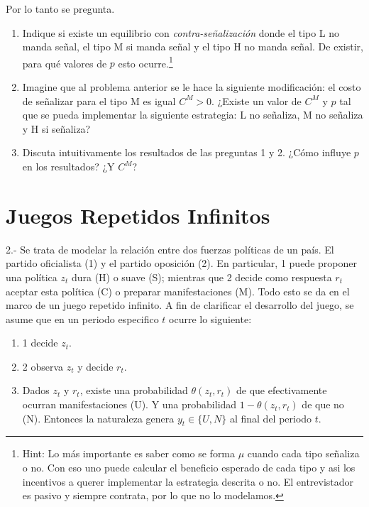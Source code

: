 \documentclass[11pt]{article}
\begin{document}
Por lo tanto se pregunta.
\begin{enumerate}
	\item Indique si existe un equilibrio con \textit{contra-se\~nalizaci\'on} donde el tipo L no manda se\~nal, el tipo M si manda se\~nal y el tipo H no manda se\~nal. De existir, para qu\'e valores de $p$ esto ocurre.\footnote{Hint: Lo m\'as importante es saber como se forma $\mu$ cuando cada tipo se\~naliza o no. Con eso uno puede calcular el beneficio esperado de cada tipo y asi los incentivos a querer implementar la estrategia descrita o no. El entrevistador es pasivo y siempre contrata, por lo que no lo modelamos.}
	\item Imagine que al problema anterior se le hace la siguiente modificaci\'on: el costo de se\~nalizar para el tipo M es igual $C^{M}>0$. ¿Existe un valor de $C^{M}$ y $p$ tal que se pueda implementar la siguiente estrategia: L no se\~naliza, M no se\~naliza y H si se\~naliza?
	\item Discuta intuitivamente los resultados de las preguntas 1 y 2. ¿C\'omo influye $p$ en los resultados? ¿Y $C^{M}$?
\end{enumerate}


\section*{Juegos Repetidos Infinitos}

2.- Se trata de modelar la relaci\'on entre dos fuerzas pol\'iticas de un pa\'is. El partido oficialista (1) y el partido oposici\'on (2). En particular, 1 puede proponer una pol\'itica $z_{t}$ dura (H) o suave (S); mientras que 2 decide como respuesta $r_{t}$ aceptar esta pol\'itica (C) o preparar manifestaciones (M). Todo esto se da en el marco de un juego repetido infinito. A fin de clarificar el desarrollo del juego, se asume que en un periodo especifico $t$ ocurre lo siguiente:
\begin{enumerate}
	\item 1 decide $z_{t}$.
	\item 2 observa $z_{t}$ y decide $r_{t}$.
	\item Dados $z_{t}$ y $r_{t}$, existe una probabilidad $\theta(z_{t},r_{t})$ de que efectivamente ocurran manifestaciones (U). Y una probabilidad $1-\theta(z_{t},r_{t})$ de que no (N). Entonces la naturaleza genera $y_{t} \in \{U,N\}$ al final del periodo $t$.
\end{enumerate}
\end{document}
